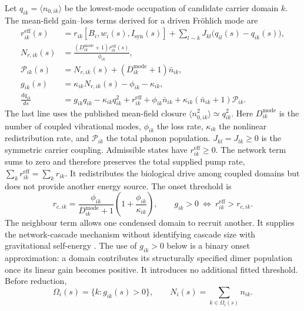 Let $q_{ik}=\langle n_{0,ik}\rangle$ be the lowest-mode occupation of candidate
carrier domain $k$. The mean-field gain--loss terms derived for a driven
Fr{\"o}hlich mode are \citep{zhang2019frohlich,wang2022frohlich}
\begin{equation}
\begin{aligned}
  r_{ik}^{\mathrm{eff}}(s)
    &=r_{ik}[B_i,w_i(s),I_{\mathrm{syn}}(s)]
      +\sum_{l\sim k}J_{kl}\bigl(q_{il}(s)-q_{ik}(s)\bigr),\\
  N_{r,ik}(s)
    &=\frac{(D_{ik}^{\mathrm{mode}}+1)r_{ik}^{\mathrm{eff}}(s)}{\phi_{ik}},\\
  \mathcal P_{ik}(s)
    &=N_{r,ik}(s)+(D_{ik}^{\mathrm{mode}}+1)\bar n_{ik},\\
  g_{ik}(s)
    &=\kappa_{ik}N_{r,ik}(s)-\phi_{ik}-\kappa_{ik},\\
  \frac{dq_{ik}}{ds}
    &=g_{ik}q_{ik}-\kappa_{ik}q_{ik}^{2}
      +r_{ik}^{\mathrm{eff}}+\phi_{ik}\bar n_{ik}
      +\kappa_{ik}(\bar n_{ik}+1)\mathcal P_{ik}.
\end{aligned}
  \label{eq:coupled_frohlich_recruitment}
\end{equation}
\noindent The last line uses the published mean-field closure
$\langle n_{0,ik}^2\rangle\simeq q_{ik}^2$. Here $D_{ik}^{\mathrm{mode}}$ is the
number of coupled vibrational modes, $\phi_{ik}$ the loss rate, $\kappa_{ik}$ the
nonlinear redistribution rate, and $\mathcal P_{ik}$ the total phonon population.
$J_{kl}=J_{lk}\geq0$ is the symmetric carrier coupling. Admissible states have
$r_{ik}^{\mathrm{eff}}\geq0$. The network term sums to zero and
therefore preserves the total supplied pump rate,
$\sum_k r_{ik}^{\mathrm{eff}}=\sum_k r_{ik}$. It redistributes the biological drive
among coupled domains but does not provide another energy source. The onset threshold
is
\begin{equation}
  r_{c,ik}=\frac{\phi_{ik}}{D_{ik}^{\mathrm{mode}}+1}
  \left(1+\frac{\phi_{ik}}{\kappa_{ik}}\right),
  \qquad
  g_{ik}>0\ \Longleftrightarrow\ r_{ik}^{\mathrm{eff}}>r_{c,ik}.
  \label{eq:frohlich_recruitment_threshold}
\end{equation}
The neighbour term allows one condensed domain to recruit another. It supplies the
network-cascade mechanism without identifying cascade size with gravitational
self-energy \citep{diazpalencia2025}. The use of $g_{ik}>0$ below is a binary onset
approximation: a domain contributes its structurally specified dimer population once
its linear gain becomes positive. It introduces no additional fitted threshold.
Before reduction,
\begin{equation}
  \Omega_i(s)=\{k:g_{ik}(s)>0\},
  \qquad N_i(s)=\sum_{k\in\Omega_i(s)}n_{ik}.
  \label{eq:coherent_domain}
\end{equation}

